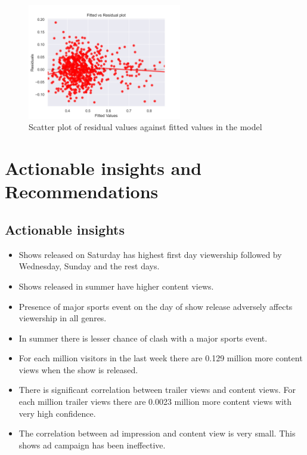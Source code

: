 \documentclass[12pt,a4paper]{style}
\begin{document}
\begin{figure}[h]
	\centering
	\includegraphics[width=0.6\textwidth]{Fitted_Vs_Residual.png}
	\caption{Scatter plot of residual values against fitted values in the model }
	\label{fig:Fitted_Vs_Residual}
\end{figure}





\section{Actionable insights and Recommendations}
\subsection{Actionable insights}
\begin{itemize}
	\item Shows released on Saturday has  highest first day viewership followed by Wednesday, Sunday and the rest days.
	\item Shows released in summer have higher content views. 
	\item Presence of major sports event on the day of show release adversely affects viewership in all genres.
	\item In summer there is lesser chance of clash with a major sports event.
	\item  For each million visitors in the last week there are 0.129 million more content views when the show is released.
	\item There is significant correlation between trailer views and content views. For each million trailer views there are 0.0023 million more content views with very high confidence.
	\item The correlation between ad impression and content view is very small. This shows ad campaign has been ineffective.
	
\end{itemize}
  
\end{document}
